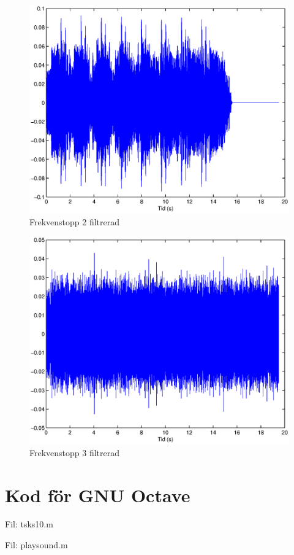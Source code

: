 \documentclass[10pt,twocolumn]{article}
\begin{document}
\begin{figure}[htp]
  \begin{center}
  \includegraphics[keepaspectratio=true,width=\linewidth]{topp2_filter.eps}  %
  \end{center}
  \caption{Frekvenstopp 2 filtrerad} %
  \label{fig:topp2_filter}
\end{figure}

\begin{figure}[htp]
  \begin{center}
  \includegraphics[keepaspectratio=true,width=\linewidth]{topp3_filter.eps}  %
  \end{center}
  \caption{Frekvenstopp 3 filtrerad} %
  \label{fig:topp3_filter}
\end{figure}

\newpage
\section{Kod för GNU Octave}

Fil: tsks10.m



\newpage

Fil: playsound.m


\end{document}
